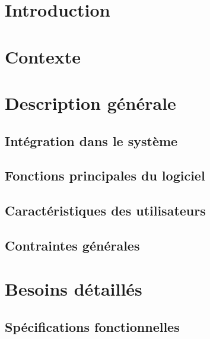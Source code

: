 \documentclass[asi]{picInsa}
\title{\DSE{}}
\author{\Kafui{}} %
\begin{document}
\couverture{}

 \informationsGenerales{}


\tableofcontents

\setcounter{chapter}{0}


\chapter*{Introduction}
\label{introduction}


\chapter{Contexte}
\label{contexte}



\chapter{Description générale}

\section{Intégration dans le système}
\label{inte_sys}


\section{Fonctions principales du logiciel}
\label{fonct_princ}


\section{Caractéristiques des utilisateurs}
\label{caracteristiques_des_utilisateurs}


\section{Contraintes générales}
\label{contraintes_generales}


\chapter{Besoins détaillés}

\section{Spécifications fonctionnelles}
\label{specifications_fonctionnelles}

\end{document}
